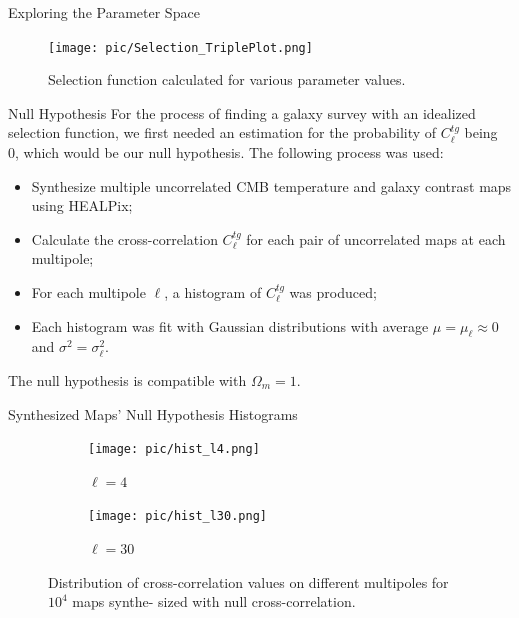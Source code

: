 \documentclass[serif, aspectratio=169]{beamer}
\begin{document}
\begin{frame}{Exploring the Parameter Space}
    \begin{figure}
        \centering
        \texttt{[image: pic/Selection\_TriplePlot.png]}
        \caption{Selection function calculated for various parameter values.}
        \label{fig:selection_triplePlot}
    \end{figure}
\end{frame}

\begin{frame}{Null Hypothesis}
    For the process of finding a galaxy survey with an idealized selection function, we first needed an estimation for the probability of $C_\ell^{tg}$ being 0, which would be our null hypothesis. The following process was used: 

    \begin{itemize}
        \item Synthesize multiple uncorrelated CMB temperature and galaxy contrast maps using HEALPix;
        \item Calculate the cross-correlation $C_\ell^{tg}$ for each pair of uncorrelated maps at each multipole;
        \item For each multipole $\ell$, a histogram of $C_\ell^{tg}$ was produced;
        \item Each histogram was fit with Gaussian distributions with average $\mu=\mu_\ell\approx 0$ and $\sigma^2=\sigma_\ell^2$.
    \end{itemize}
    
    The null hypothesis is compatible with $\Omega_m=1$.
\end{frame}

\begin{frame}{Synthesized Maps' Null Hypothesis Histograms}
    \begin{figure}

        \begin{subfigure}[b]{0.45\linewidth}
            \centering
            \texttt{[image: pic/hist\_l4.png]}
            \caption{$\ell=4$}
            \label{fig:hist_l4}
        \end{subfigure}
        \hfill
        \begin{subfigure}[b]{0.45\linewidth}
            \centering
            \texttt{[image: pic/hist\_l30.png]}
            \caption{$\ell=30$}
            \label{fig:hist_l30}
        \end{subfigure}
        
        \caption{Distribution of cross-correlation values on different multipoles for $10^4$ maps synthe-
sized with null cross-correlation.}
        \label{fig:hists}
    \end{figure}
\end{frame}
\end{document}

